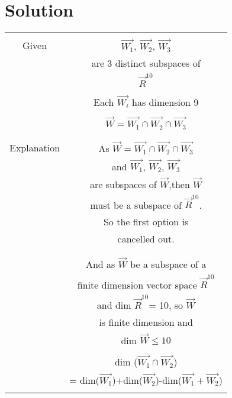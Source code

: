 \documentclass[journal,12pt,twocolumn]{IEEEtran}
\begin{document}
\section{Solution} 
\begin{table}[h!]
\begin{center}
\begin{tabular}{|c|c|}
\hline
& \\
Given & $\vec{W_1}$, $\vec{W_2}$, $\vec{W_3}$\\
& are 3 distinct subspaces of \\
& $\vec{R}^{10}$\\
& \\
& Each $\vec{W_i}$ has dimension 9\\
& \\
& $\vec{W} = \vec{W_1} \cap \vec{W_2} \cap \vec{W_3}$\\
& \\
\hline
& \\
Explanation & As $\vec{W} = \vec{W_1} \cap \vec{W_2}\cap \vec{W_3}$\\
& and $\vec{W_1}$, $\vec{W_2}$, $\vec{W_3}$ \\
& are subspaces of $\vec{W}$,then $\vec{W}$\\
& must be a subspace of $\vec{R}^{10}$.\\
& So the first option is \\
& cancelled out.\\
& \\
\hline
& \\
& And as $\vec{W}$ be a subspace of a \\
& finite dimension vector space $\vec{R}^{10}$ \\
& and dim $\vec{R}^{10}$= 10, so $\vec{W}$ \\
& is finite dimension and \\
& dim $\vec{W} \leq 10$ \\
& \\
\hline
& dim ($\vec{W_1} \cap \vec{W_2}$)\\
& = dim($\vec{W_1}$)+dim($\vec{W_2}$)-dim($\vec{W_1}+\vec{W_2}$)\\
& \\
\hline
\end{tabular}
\end{center}
\end{table}
\end{document}
